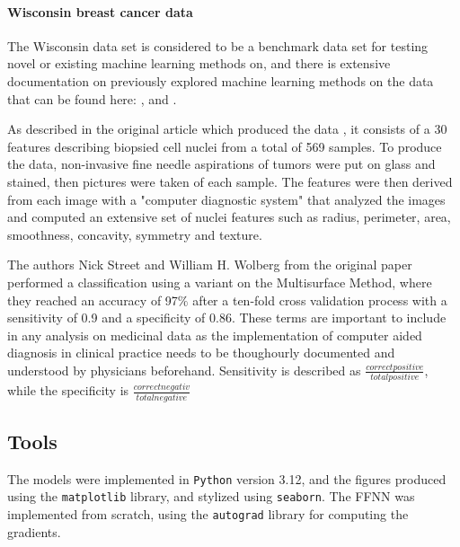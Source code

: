 \paragraph{Wisconsin breast cancer data}
The Wisconsin data set \cite{bc_wisconsin} is considered to be a benchmark data set for testing novel or existing machine learning methods on, and 
there is extensive documentation on previously explored machine learning methods on the data that can be found here: 
\cite{wisconsin_example1}, \cite{wisconsin_example2} and \cite{wisconsin_example3}.

As described in the original article which produced the data \cite{first_wisconsin}, it consists of a 30 features describing biopsied cell nuclei from 
a total of 569 samples. To produce the data, non-invasive fine needle aspirations of tumors were put on glass and stained, 
then pictures were taken of each sample. The features were then derived from each image with a "computer diagnostic system" that 
analyzed the images and computed an extensive set of nuclei features such as radius, perimeter, area, smoothness, concavity, symmetry and texture. 

The authors Nick Street and William H. Wolberg from the original paper performed a classification using a variant on the Multisurface 
Method, where they reached an accuracy of 97$\%$ after a ten-fold cross validation process with a sensitivity of 0.9 and a specificity of 0.86. 
These terms are important to include in any analysis on medicinal data as the implementation of computer aided diagnosis in clinical practice 
needs to be thoughourly documented and understood by physicians beforehand. Sensitivity is described as $\frac{correct positive}{total positive}$, 
while the specificity is $\frac{correct negativ}{total negative}$
%
\subsection{Tools}\label{ssec:tools}
The models were implemented in \verb|Python| version 3.12, and the figures produced using the \verb|matplotlib| library, and stylized using \verb|seaborn|. The FFNN was implemented from scratch, using the \verb|autograd| library \cite{maclaurin2015:autograd} for computing the gradients.